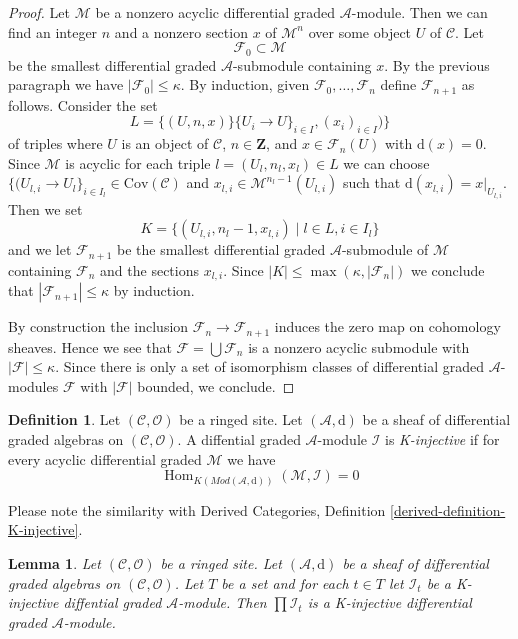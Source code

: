 \documentclass{stacks-project}
\theoremstyle{plain}
\newtheorem{lemma}[subsection]{Lemma}
\theoremstyle{definition}
\newtheorem{definition}[subsection]{Definition}
\theoremstyle{remark}
\numberwithin{equation}{subsection}
\def\Hom{\mathop{\mathrm{Hom}}\nolimits}
\begin{document}
\begin{proof}
\medskip\noindent
Let $\mathcal{M}$ be a nonzero acyclic differential graded
$\mathcal{A}$-module. Then we can find an integer $n$ and a
nonzero section $x$ of $\mathcal{M}^n$ over some object $U$
of $\mathcal{C}$. Let
$$
\mathcal{F}_0 \subset \mathcal{M}
$$
be the smallest differential graded $\mathcal{A}$-submodule
containing $x$. By the previous paragraph we have
$|\mathcal{F}_0| \leq \kappa$. By induction, given
$\mathcal{F}_0, \ldots, \mathcal{F}_n$ define
$\mathcal{F}_{n + 1}$ as follows. Consider the set
$$
L = \{(U, n, x)\}
\{U_i \to U\}_{i \in I}, (x_i)_{i \in I})\}
$$
of triples where $U$ is an object of $\mathcal{C}$, $n \in \mathbf{Z}$,
and $x \in \mathcal{F}_n(U)$ with $\text{d}(x) = 0$. Since
$\mathcal{M}$ is acyclic for each triple $l = (U_l, n_l, x_l) \in L$
we can choose
$\{(U_{l, i} \to U_l\}_{i \in I_l} \in \text{Cov}(\mathcal{C})$ and
$x_{l, i} \in \mathcal{M}^{n_l - 1}(U_{l, i})$ such that
$\text{d}(x_{l, i}) = x|_{U_{l, i}}$. Then we set
$$
K = \{(U_{l, i}, n_l - 1, x_{l, i}) \mid l \in L, i \in I_l\}
$$
and we let $\mathcal{F}_{n + 1}$ be the smallest differential
graded $\mathcal{A}$-submodule of $\mathcal{M}$ containing
$\mathcal{F}_n$ and the sections $x_{l, i}$.
Since $|K| \leq \max(\kappa, |\mathcal{F}_n|)$
we conclude that $|\mathcal{F}_{n + 1}| \leq \kappa$ by induction.

\medskip\noindent
By construction the inclusion $\mathcal{F}_n \to \mathcal{F}_{n + 1}$
induces the zero map on cohomology sheaves. Hence we see that
$\mathcal{F} = \bigcup \mathcal{F}_n$ is a nonzero acyclic submodule
with $|\mathcal{F}| \leq \kappa$. Since there is only a set
of isomorphism classes of differential graded $\mathcal{A}$-modules
$\mathcal{F}$ with $|\mathcal{F}|$ bounded, we conclude.
\end{proof}

\begin{definition}
\label{definition-K-injective}
Let $(\mathcal{C}, \mathcal{O})$ be a ringed site.
Let $(\mathcal{A}, \text{d})$ be a sheaf of differential graded algebras
on $(\mathcal{C}, \mathcal{O})$. A diffential graded $\mathcal{A}$-module
$\mathcal{I}$ is {\it K-injective} if for every acyclic
differential graded $\mathcal{M}$ we have 
$$
\Hom_{K(\textit{Mod}(\mathcal{A}, \text{d}))}(\mathcal{M}, \mathcal{I}) = 0
$$
\end{definition}

\noindent
Please note the similarity with
Derived Categories, Definition \ref{derived-definition-K-injective}.

\begin{lemma}
\label{lemma-product-K-injective}
Let $(\mathcal{C}, \mathcal{O})$ be a ringed site.
Let $(\mathcal{A}, \text{d})$ be a sheaf of differential graded algebras
on $(\mathcal{C}, \mathcal{O})$. Let $T$ be a set and for
each $t \in T$ let $\mathcal{I}_t$ be a K-injective
diffential graded $\mathcal{A}$-module. Then
$\prod \mathcal{I}_t$ is a K-injective differential
graded $\mathcal{A}$-module.
\end{lemma}
\end{document}
